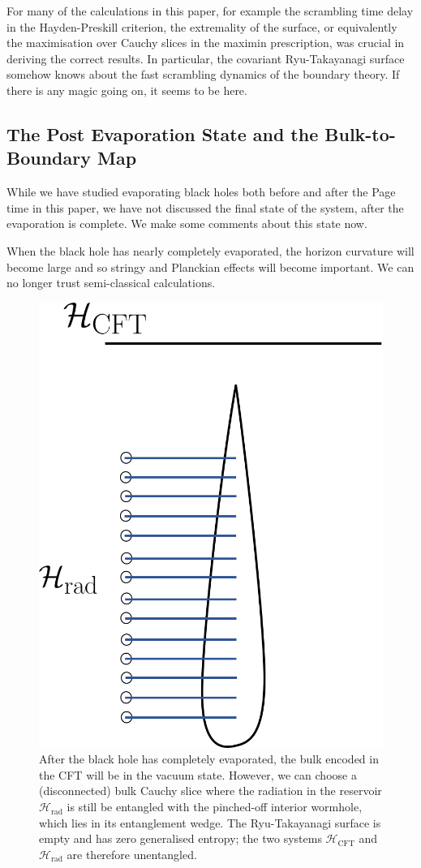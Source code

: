 \documentclass[11pt,a4paper]{article}
\begin{document}
For many of the calculations in this paper, for example the scrambling time delay in the Hayden-Preskill criterion, the extremality of the surface, or equivalently the maximisation over Cauchy slices in the maximin prescription, was crucial in deriving the correct results. In particular, the covariant Ryu-Takayanagi surface somehow knows about the fast scrambling dynamics of the boundary theory. If there is any magic going on, it seems to be here.

\subsection{The Post Evaporation State and the Bulk-to-Boundary Map} \label{sec:postevaporation}
While we have studied evaporating black holes both before and after the Page time in this paper, we have not discussed the final state of the system, after the evaporation is complete. We make some comments about this state now.

When the black hole has nearly completely evaporated, the horizon curvature will become large and so stringy and Planckian effects will become important. We can no longer trust semi-classical calculations.
\begin{figure}[t]
\includegraphics[width = 0.37\linewidth]{Evaporation_Finished.png}
\centering
\caption{After the black hole has completely evaporated, the bulk encoded in the CFT will be in the vacuum state. However, we can choose a (disconnected) bulk Cauchy slice where the radiation in the reservoir $\mathcal{H}_\text{rad}$ is still be entangled with the pinched-off interior wormhole, which lies in its entanglement wedge. The Ryu-Takayanagi surface is empty and has zero generalised entropy; the two systems $\mathcal{H}_\text{CFT}$ and $\mathcal{H}_\text{rad}$ are therefore unentangled.}
\label{fig:finished}
\end{figure}
\end{document}
